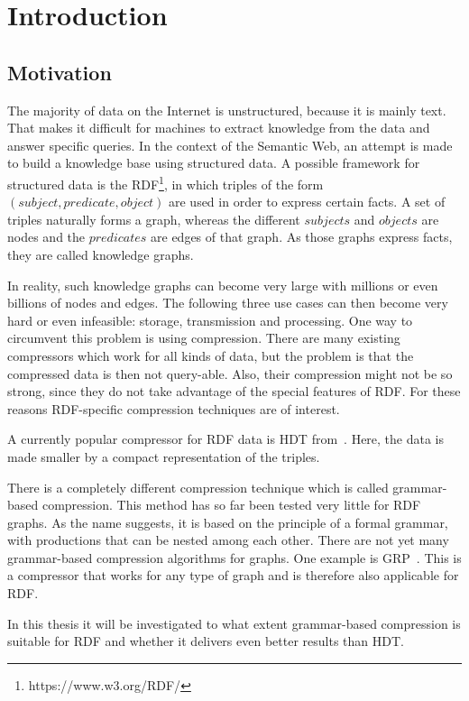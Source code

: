\chapter{Introduction}\label{ch:introduction}

\section{Motivation}
The majority of data on the Internet is unstructured, because it is mainly text. That makes it difficult for machines to extract knowledge from the data and answer specific queries. In the context of the Semantic Web, an attempt is made to build a knowledge base using structured data. A possible framework for structured data is the \ac{RDF}\footnote{https://www.w3.org/RDF/}, in which triples of the form $ (subject, predicate, object) $ are used in order to express certain facts. A set of triples naturally forms a graph, whereas the different $subjects$ and $objects$ are nodes and the $predicates$ are edges of that graph. As those graphs express facts, they are called knowledge graphs.

In reality, such knowledge graphs can become very large with millions or even billions of nodes and edges. The following three use cases can then become very hard or even infeasible: storage, transmission and processing. One way to circumvent this problem is using compression. There are many existing compressors which work for all kinds of data, but the problem is that the compressed data is then not query-able. Also, their compression might not be so strong, since they do not take advantage of the special features of RDF. For these reasons RDF-specific compression techniques are of interest.

A currently popular compressor for RDF data is \ac{HDT} from~\cite{hdt}. Here, the data is made smaller by a compact representation of the triples. 

There is a completely different compression technique which is called grammar-based compression. This method has so far been tested very little for RDF graphs. As the name suggests, it is based on the principle of a formal grammar, with productions that can be nested among each other. There are not yet many grammar-based compression algorithms for graphs. One example is \ac{GRP}~\cite{maneth}. This is a compressor that works for any type of graph and is therefore also applicable for RDF.

In this thesis it will be investigated to what extent grammar-based compression is suitable for RDF and whether it delivers even better results than HDT.


